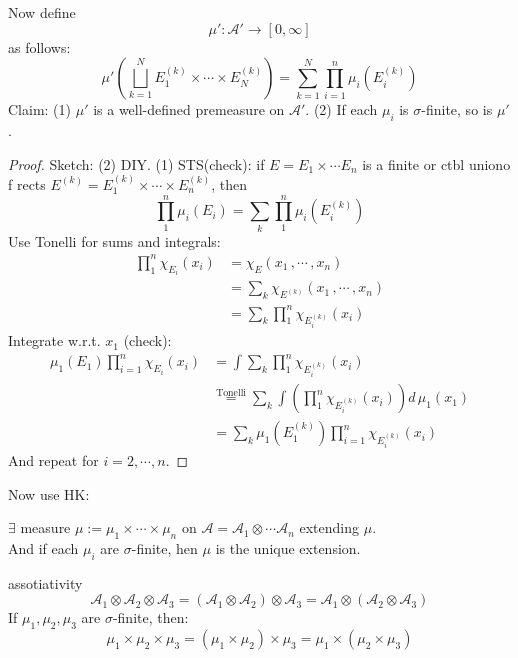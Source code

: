 \documentclass[lang=cn,11pt]{elegantbook}
\begin{document}
\begin{proposition}
    Now define $$\mu' : \mathcal{A}' \rightarrow [0,\infty]$$ as follows: $$ \mu'(\bigsqcup_{k=1}^N E_1^{(k)} \times \cdots \times E_N^{(k)}) = \sum_{k=1}^N \prod_{i=1}^n \mu_i (E_i^{(k)}) $$
Claim:
    (1) $\mu'$ is a well-defined premeasure on $\mathcal{A}'$.
    (2) If each $\mu_i$ is $\sigma$-finite, so is $\mu'$.
\end{proposition}
\begin{proof}
    Sketch: (2) DIY.
    (1) STS(check): if $E = E_1 \times \cdots E_n$ is a finite or ctbl uniono f rects $E^{(k)} = E_1^{(k)}\times \cdots \times E_n^{(k)} $, then $$\prod_1^n  \mu_i(E_i) = \sum_k \prod_1^n \mu_i(E_i^{(k)})  $$
    Use Tonelli for sums and integrals: \begin{align}
        \prod_1^n \chi_{E_i} (x_i) &= \chi_E (x_1\,, \cdots \,,x_n) \\
        &= \sum_k \chi_{E^{(k)}} (x_1 \,, \cdots \,, x_n) \\
        &= \sum_k \prod_1^n \chi_{E_i^{(k)}} (x_i)
    \end{align}
Integrate w.r.t.  $x_1$ (check): 
\begin{align}
\mu_1(E_1) \prod_{i=1}^n \chi_{E_i} (x_i)& = \int \sum_k \prod_1^n \chi_{E_i ^{(k)}} (x_i)    \\
&\overset{\text{Tonelli}}{=}  \sum_k  \int (\prod_1^n   \chi_{E_i ^{(k)}} (x_i) )  d \, \mu_1 (x_1) \\
& = \sum_k \mu_1(E_1^{(k)}) \prod_{i=1}^n \chi_{E_i^{(k)}} (x_i)
\end{align}
And repeat for $i=2,\cdots,n$.
\end{proof}


Now use HK:
\begin{corollary}
    $\exists$ measure $\mu := \mu_1 \times \cdots \times \mu_n$ on $\mathcal{A} = \mathcal{A}_1 \otimes \cdots \mathcal{A}_n$ extending $\mu$.\\
    And if each $\mu_i $ are $\sigma$-finite, hen $\mu$ is the unique extension.
\end{corollary}


\begin{corollary}{assotiativity}
$$ \mathcal{A}_1 \otimes \mathcal{A}_2  \otimes \mathcal{A}_3 =  (\mathcal{A}_1 \otimes \mathcal{A}_2)  \otimes \mathcal{A}_3 =   \mathcal{A}_1 \otimes (\mathcal{A}_2  \otimes \mathcal{A}_3 ) $$
If $\mu_1, \mu_2,\mu_3$ are $\sigma$-finite, then: $$\mu_1 \times \mu_2 \times \mu_3 = (\mu_1 \times \mu_2) \times \mu_3  = \mu_1 \times (\mu_2 \times \mu_3 )$$
\end{corollary}
\end{document}
